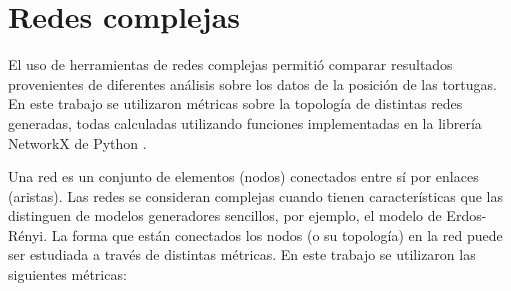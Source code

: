 \section{Redes complejas}
El uso de herramientas de redes complejas permitió comparar resultados provenientes de diferentes análisis sobre los datos de la posición de las tortugas. En este trabajo se utilizaron métricas sobre la topología de distintas redes generadas, todas calculadas utilizando  funciones implementadas en la librería NetworkX de Python \cite{networkx}.
 
Una red es un conjunto de elementos (nodos) conectados entre sí por enlaces (aristas). Las redes se consideran complejas cuando tienen características que las distinguen de modelos generadores sencillos, por ejemplo, el modelo de Erdos-Rényi. La forma que están conectados los nodos (o su topología) en la red puede ser estudiada a través de distintas métricas. En este trabajo se utilizaron las siguientes métricas:
